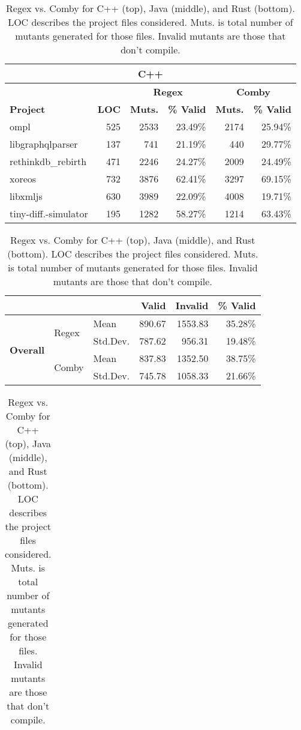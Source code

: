 \documentclass[sigconf,review, anonymous]{acmart}
\newcommand{\mc}[3]{\multicolumn{#1}{#2}{#3}}
\begin{document}
{%
\begin{table}[hbtp]
\centering
\caption{Regex vs. Comby for C++ (top), Java (middle), and Rust (bottom). LOC describes the project files considered. Muts. is total number of mutants generated for those files. Invalid mutants are those that don't compile.}
\label{tab:table_cpp1javarust}
\begin{tabularx}{\columnwidth}{X|r|rr|rr}
\bottomrule\toprule
\mc{6}{c}{\textbf{C++}} \\\midrule
                 &              & \multicolumn{2}{c|}{\textbf{Regex}} &\multicolumn{2}{c}{\textbf{Comby}}  \\
\textbf{Project} & \textbf{LOC} & \textbf{Muts.} & \textbf{\% Valid} & \textbf{Muts.} &  \textbf{\% Valid} \\\midrule
ompl & 525 & 2533 & 23.49\% &  2174  & 25.94\%   \\
{\small libgraphqlparser} & 137 & 741 & 21.19\%  & 440 & 29.77\% \\
{\small rethinkdb\_rebirth} &471 & 2246 & 24.27\% & 2009 & 24.49\% \\
xoreos & 732  & 3876  & 62.41\% & 3297 & 69.15\% \\
libxmljs &630 &  3989 & 22.09\% & 4008 & 19.71\% \\[0.5ex]
tiny-diff.-simulator &  195 & 1282 &58.27\% & 1214 & 63.43\% \\
\bottomrule
\end{tabularx}
\begin{tabularx}{\columnwidth}{Xllrrr}
                  & &       & \textbf{Valid}  & \textbf{Invalid}  & \textbf{\% Valid} \\\midrule
 \multirow{4}{*}{\textbf{Overall}} & \multirow{2}{*}{Regex} & Mean     & 890.67 &  1553.83 & 35.28\% \\
                          & & Std.Dev. & 787.62 & 956.31   & 19.48\%  \\\cline{2-6}
  & \multirow{2}{*}{Comby}  & Mean     & 837.83 & 1352.50 & 38.75\%  \\
                         & & Std.Dev. & 745.78 & 1058.33& 21.66\%  \\\bottomrule
 \end{tabularx}
\begin{tabularx}{\columnwidth}{X|r|cr|cr}

\end{tabularx}
\end{table}}
\end{document}
